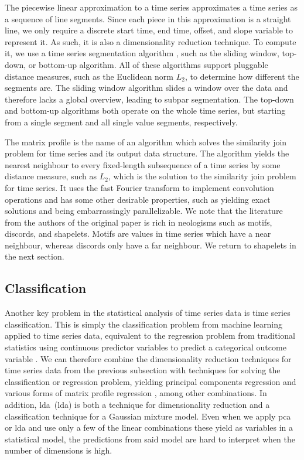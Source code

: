 The piecewise linear approximation to a time series \citep{DBLP:journals/tc/PavlidisH74} approximates a time series as a sequence of line segments.
Since each piece in this approximation is a straight line, we only require a discrete start time, end time, offset, and slope variable to represent it.
As such, it is also a dimensionality reduction technique.
To compute it, we use a time series segmentation algorithm \citep{DBLP:conf/icdm/KeoghCHP01}, such as the sliding window, top-down, or bottom-up algorithm.
All of these algorithms support pluggable distance measures, such as the Euclidean norm $L_{2}$, to determine how different the segments are.
The sliding window algorithm slides a window over the data and therefore lacks a global overview, leading to subpar segmentation.
The top-down and bottom-up algorithms both operate on the whole time series, but starting from a single segment and all single value segments, respectively.

The matrix profile \citep{DBLP:conf/icdm/YehZUBDDSMK16} is the name of an algorithm which solves the similarity join problem for time series and its output data structure.
The algorithm yields the nearest neighbour to every fixed-length subsequence of a time series by some distance measure, such as $L_{2}$, which is the solution to the similarity join problem for time series.
It uses the fast Fourier transform to implement convolution operations and has some other desirable properties, such as yielding exact solutions and being embarrassingly parallelizable.
We note that the literature from the authors of the original paper is rich in neologisms such as motifs, discords, and shapelets.
Motifs are values in time series which have a near neighbour, whereas discords only have a far neighbour.
We return to shapelets in the next section.

\subsection{Classification}

Another key problem in the statistical analysis of time series data is time series classification.
This is simply the classification problem from machine learning \citep{hastie2009elements} applied to time series data, equivalent to the regression problem from traditional statistics using continuous predictor variables to predict a categorical outcome variable \citep{agresti2003categorical}.
We can therefore combine the dimensionality reduction techniques for time series data from the previous subsection with techniques for solving the classification or regression problem, yielding principal components regression \citep{hastie2009elements} and various forms of matrix profile regression \citep{DBLP:journals/frai/GuidottiD21,seoni2021template}, among other combinations.
In addition, \acrlong{lda}~(\acrshort{lda}) \citep{hastie2009elements,mardia1979multivariate} is both a technique for dimensionality reduction and a classification technique for a Gaussian mixture model.
Even when we apply \acrshort{pca} or \acrshort{lda} and use only a few of the linear combinations these yield as variables in a statistical model, the predictions from said model are hard to interpret when the number of dimensions is high.

